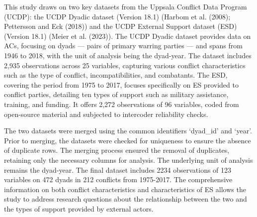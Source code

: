 \documentclass[
]{article}
\begin{document}
This study draws on two key datasets from the Uppsala Conflict Data
Program (UCDP): the UCDP Dyadic dataset (Version 18.1) (Harbom et al.
(2008); Pettersson and Eck (2018)) and the UCDP External Support dataset
(ESD) (Version 18.1) (Meier et al. (2023)). The UCDP Dyadic dataset
provides data on ACs, focusing on dyads --- pairs of primary warring
parties --- and spans from 1946 to 2018, with the unit of analysis being
the dyad-year. The dataset includes 2,935 observations across 25
variables, capturing various conflict characteristics such as the type
of conflict, incompatibilities, and combatants. The ESD, covering the
period from 1975 to 2017, focuses specifically on ES provided to
conflict parties, detailing ten types of support such as military
assistance, training, and funding. It offers 2,272 observations of 96
variables, coded from open-source material and subjected to intercoder
reliability checks.

The two datasets were merged using the common identifiers `dyad\_id' and
`year'. Prior to merging, the datasets were checked for uniqueness to
ensure the absence of duplicate rows. The merging process ensured the
removal of duplicates, retaining only the necessary columns for
analysis. The underlying unit of analysis remains the dyad-year. The
final dataset includes 2234 observations of 123 variables on 472 dyads
in 212 conflicts from 1975-2017. The comprehensive information on both
conflict characteristics and characteristics of ES allows the study to
address research questions about the relationship between the two and
the types of support provided by external actors.
\end{document}
